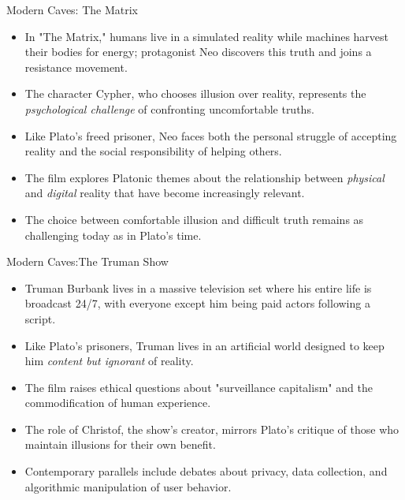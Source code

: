\documentclass[aspectratio=169]{beamer}
\begin{document}
\begin{frame}{Modern Caves: The Matrix}
    \begin{itemize}
        \item In "The Matrix," humans live in a simulated reality while machines harvest their bodies for energy; protagonist Neo discovers this truth and joins a resistance movement.
        \item The character Cypher, who chooses illusion over reality, represents the \emph{psychological challenge} of confronting uncomfortable truths.
        \item Like Plato's freed prisoner, Neo faces both the personal struggle of accepting reality and the social responsibility of helping others.
        \item The film explores Platonic themes about the relationship between \emph{physical} and \emph{digital} reality that have become increasingly relevant.
        \item The choice between comfortable illusion and difficult truth remains as challenging today as in Plato's time.
        \end{itemize}
    \end{frame}

    \begin{frame}{Modern Caves:The Truman Show}
        \begin{itemize}
        \item Truman Burbank lives in a massive television set where his entire life is broadcast 24/7, with everyone except him being paid actors following a script.
        \item Like Plato's prisoners, Truman lives in an artificial world designed to keep him \emph{content but ignorant} of reality.
        \item The film raises ethical questions about "surveillance capitalism" and the commodification of human experience.
        \item The role of Christof, the show's creator, mirrors Plato's critique of those who maintain illusions for their own benefit.
        \item Contemporary parallels include debates about privacy, data collection, and algorithmic manipulation of user behavior.
        \end{itemize}
    \end{frame}
\end{document}
